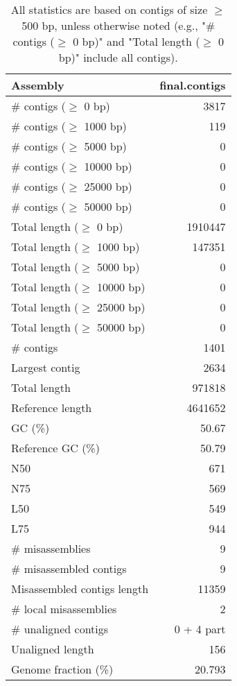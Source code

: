 \documentclass[12pt,a4paper]{article}
\begin{document}
\begin{table}[ht]
\begin{center}
\caption{All statistics are based on contigs of size $\geq$ 500 bp, unless otherwise noted (e.g., "\# contigs ($\geq$ 0 bp)" and "Total length ($\geq$ 0 bp)" include all contigs).}
\begin{tabular}{|l*{1}{|r}|}
\hline
Assembly & final.contigs \\ \hline
\# contigs ($\geq$ 0 bp) & 3817 \\ \hline
\# contigs ($\geq$ 1000 bp) & 119 \\ \hline
\# contigs ($\geq$ 5000 bp) & 0 \\ \hline
\# contigs ($\geq$ 10000 bp) & 0 \\ \hline
\# contigs ($\geq$ 25000 bp) & 0 \\ \hline
\# contigs ($\geq$ 50000 bp) & 0 \\ \hline
Total length ($\geq$ 0 bp) & 1910447 \\ \hline
Total length ($\geq$ 1000 bp) & 147351 \\ \hline
Total length ($\geq$ 5000 bp) & 0 \\ \hline
Total length ($\geq$ 10000 bp) & 0 \\ \hline
Total length ($\geq$ 25000 bp) & 0 \\ \hline
Total length ($\geq$ 50000 bp) & 0 \\ \hline
\# contigs & 1401 \\ \hline
Largest contig & 2634 \\ \hline
Total length & 971818 \\ \hline
Reference length & 4641652 \\ \hline
GC (\%) & 50.67 \\ \hline
Reference GC (\%) & 50.79 \\ \hline
N50 & 671 \\ \hline
N75 & 569 \\ \hline
L50 & 549 \\ \hline
L75 & 944 \\ \hline
\# misassemblies & 9 \\ \hline
\# misassembled contigs & 9 \\ \hline
Misassembled contigs length & 11359 \\ \hline
\# local misassemblies & 2 \\ \hline
\# unaligned contigs & 0 + 4 part \\ \hline
Unaligned length & 156 \\ \hline
Genome fraction (\%) & 20.793 \\ \hline

\end{tabular}
\end{center}
\end{table}
\end{document}
